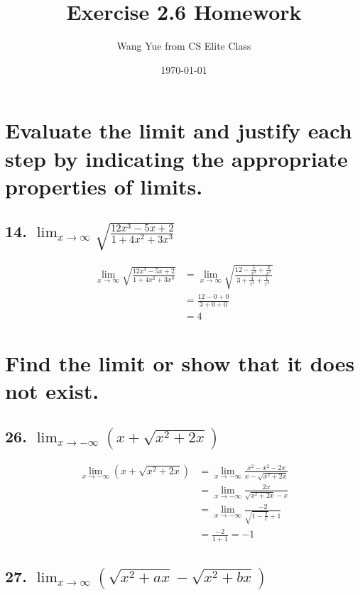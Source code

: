\documentclass{article}
\begin{document}
    \title{Exercise 2.6 Homework}
    \author{Wang Yue from CS Elite Class}
    \date{\today}

    \maketitle

    \section*{Evaluate the limit and justify each step by indicating the appropriate properties of limits.}

    \subsection*{14. $\lim_{x \to \infty}\sqrt{\frac{12x^3 - 5x + 2}{1 + 4x^2 + 3x^3}}$}

    $$
    \begin{aligned}
        \lim_{x \to \infty}\sqrt{\frac{12x^3 - 5x + 2}{1 + 4x^2 + 3x^3}} &= \lim_{x \to \infty}\sqrt{\frac{12 - \frac{5}{x^2} + \frac{2}{x^3}}{3 + \frac{4}{x^2} + \frac{1}{x^3}}} \\
        &= \frac{12 - 0 + 0}{3 + 0 + 0} \\
        &= 4
    \end{aligned}
    $$

    \section*{Find the limit or show that it does not exist.}

    \subsection*{26. $\lim_{x \to -\infty}(x + \sqrt{x^2 + 2x})$}

    $$
    \begin{aligned}
        \lim_{x \to -\infty}(x + \sqrt{x^2 + 2x}) &= \lim_{x \to -\infty}\frac{x^2 - x^2 - 2x}{x - \sqrt{x^2 + 2x}} \\
        &= \lim_{x \to -\infty}\frac{2x}{\sqrt{x^2 + 2x} - x} \\
        &= \lim_{x \to -\infty}\frac{-2}{\sqrt{1 - \frac 2 x} + 1} \\
        &= \frac{-2}{1 + 1} = -1
    \end{aligned}
    $$

    \subsection*{27. $\lim_{x \to \infty}(\sqrt{x^2 + ax} - \sqrt{x^2 + bx})$}
\end{document}
